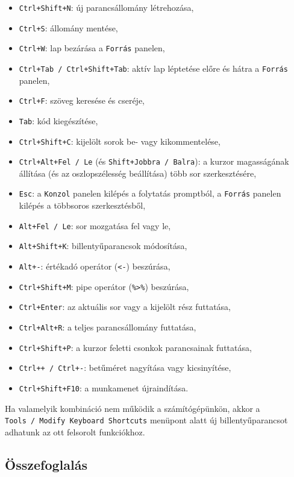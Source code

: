 \documentclass[
]{book}
\providecommand{\tightlist}{%
  \setlength{\itemsep}{0pt}\setlength{\parskip}{0pt}}
\begin{document}
\begin{itemize}
\tightlist
\item
  \texttt{Ctrl+Shift+N}: új parancsállomány létrehozása,
\item
  \texttt{Ctrl+S}: állomány mentése,
\item
  \texttt{Ctrl+W}: lap bezárása a \texttt{Forrás} panelen,
\item
  \texttt{Ctrl+Tab\ /\ Ctrl+Shift+Tab}: aktív lap léptetése előre és hátra a \texttt{Forrás} panelen,
\item
  \texttt{Ctrl+F}: szöveg keresése és cseréje,
\item
  \texttt{Tab}: kód kiegészítése,
\item
  \texttt{Ctrl+Shift+C}: kijelölt sorok be- vagy kikommentelése,
\item
  \texttt{Ctrl+Alt+Fel\ /\ Le} (és \texttt{Shift+Jobbra\ /\ Balra}): a kurzor magasságának állítása (és az oszlopszélesség beállítása) több sor szerkesztésére,
\item
  \texttt{Esc}: a \texttt{Konzol} panelen kilépés a folytatás promptból, a \texttt{Forrás} panelen kilépés a többsoros szerkesztésből,
\item
  \texttt{Alt+Fel\ /\ Le}: sor mozgatása fel vagy le,
\item
  \texttt{Alt+Shift+K}: billentyűparancsok módosítása,
\item
  \texttt{Alt+-}: értékadó operátor (\texttt{\textless{}-}) beszúrása,
\item
  \texttt{Ctrl+Shift+M}: pipe operátor (\texttt{\%\textgreater{}\%}) beszúrása,
\item
  \texttt{Ctrl+Enter}: az aktuális sor vagy a kijelölt rész futtatása,
\item
  \texttt{Ctrl+Alt+R}: a teljes parancsállomány futtatása,
\item
  \texttt{Ctrl+Shift+P}: a kurzor feletti csonkok parancsainak futtatása,
\item
  \texttt{Ctrl++\ /\ Ctrl+-}: betűméret nagyítása vagy kicsinyítése,
\item
  \texttt{Ctrl+Shift+F10}: a munkamenet újraindítása.
\end{itemize}

Ha valamelyik kombináció nem működik a számítógépünkön, akkor a \texttt{Tools\ /\ Modify\ Keyboard\ Shortcuts} menüpont alatt új billentyűparancsot adhatunk az ott felsorolt funkciókhoz.

\hypertarget{munka-az-r-ben-1-summary}{%
\subsection{Összefoglalás}\label{munka-az-r-ben-1-summary}}
\end{document}
